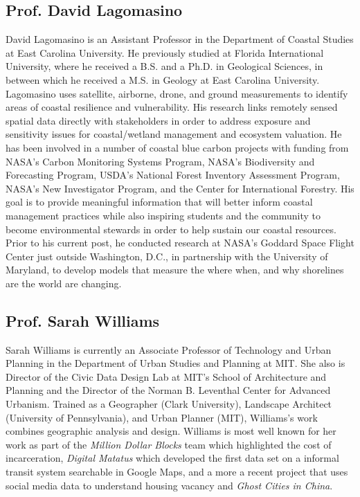 \documentclass[notitlepage]{article}
\begin{document}
\subsection*{Prof. David Lagomasino}

David Lagomasino is an Assistant Professor in the Department of Coastal Studies at East Carolina University. He previously studied at Florida International University, where he received a B.S. and a Ph.D. in Geological Sciences, in between which he received a M.S. in Geology at East Carolina University. Lagomasino uses satellite, airborne, drone, and ground measurements to identify areas of coastal resilience and vulnerability. His research links remotely sensed spatial data directly with stakeholders in order to address exposure and sensitivity issues for coastal/wetland management and ecosystem valuation. He has been involved in a number of  coastal blue carbon projects with funding from NASA’s Carbon Monitoring Systems Program,  NASA’s Biodiversity and Forecasting Program, USDA’s National Forest Inventory Assessment Program,  NASA’s New Investigator Program, and the Center for International Forestry. His goal is to provide meaningful information that will better inform coastal management practices while also inspiring students and the community to become environmental stewards in order to help sustain our coastal resources. Prior to his current post, he conducted research at NASA’s Goddard Space Flight Center just outside Washington, D.C., in partnership with the University of Maryland, to develop models that measure the where when, and why shorelines are the world are changing.

\subsection*{Prof. Sarah Williams}

Sarah Williams is currently an Associate Professor of Technology and Urban Planning in the Department of Urban Studies and Planning at MIT. She also is Director of the Civic Data Design Lab at MIT's School of Architecture and Planning and the Director of the Norman B. Leventhal Center for Advanced Urbanism. Trained as a Geographer (Clark University), Landscape Architect (University of Pennsylvania), and Urban Planner (MIT), Williams's work combines geographic analysis and design. Williams is most well known for her work as part of the \emph{Million Dollar Blocks} team which highlighted the cost of incarceration, \emph{Digital Matatus} which developed the first data set on a informal transit system searchable in Google Maps, and a more a recent project that uses social media data to understand housing vacancy and \emph{Ghost Cities in China}.
\end{document}
